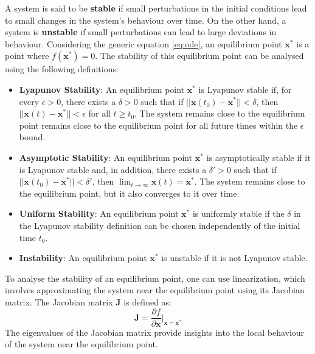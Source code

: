 A system is said to be \textbf{stable} if small perturbations in the initial conditions lead to small changes in the system's behaviour over time.
On the other hand, a system is \textbf{unstable} if small perturbations can lead to large deviations in behaviour.
\newline
Considering the generic equation \ref{eq:ode}, an equilibrium point $\mathbf{x}^*$ is a point where $f(\mathbf{x}^*) = 0$. The stability of this equilibrium point can be analysed using the following definitions:
\begin{itemize}
    \item \textbf{Lyapunov Stability}: An equilibrium point $\mathbf{x}^*$ is Lyapunov stable if, for every $\epsilon > 0$, there exists a $\delta > 0$ such that if $||\mathbf{x}(t_0) - \mathbf{x}^*|| < \delta$, 
    then $||\mathbf{x}(t) - \mathbf{x}^*|| < \epsilon$ for all $t \geq t_0$. The system remains close to the equilibrium point remains close to the equilibrium point for all future times within the $\epsilon$ bound. 
    
    \item \textbf{Asymptotic Stability}: An equilibrium point $\mathbf{x}^*$ is asymptotically stable if it is Lyapunov stable and, 
    in addition, there exists a $\delta' > 0$ such that if $||\mathbf{x}(t_0) - \mathbf{x}^*|| < \delta'$, then $\lim_{t \to \infty} \mathbf{x}(t) = \mathbf{x}^*$. The system remains close to the equilibrium point, but it also converges to it over time.
    \item \textbf{Uniform Stability}: An equilibrium point $\mathbf{x}^*$ is uniformly stable if the $\delta$ in the Lyapunov stability definition can be chosen independently of the initial time $t_0$.
    \item \textbf{Instability}: An equilibrium point $\mathbf{x}^*$ is unstable if it is not Lyapunov stable.
\end{itemize}

To analyse the stability of an equilibrium point, one can use linearization, which involves approximating the system near the equilibrium point using its Jacobian matrix.
The Jacobian matrix $\mathbf{J}$ is defined as:
\begin{equation}
    \mathbf{J} = \frac{\partial f}{\partial \mathbf{x}} \bigg|_{\mathbf{x} = \mathbf{x}^*}
\end{equation}
The eigenvalues of the Jacobian matrix provide insights into the local behaviour of the system near the equilibrium point.

\clearpage
